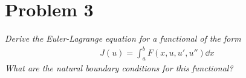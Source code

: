 \documentclass[12pt]{article}
\theoremstyle{plain}
\begin{document}

\section*{Problem 3}
\textit{Derive the Euler-Lagrange equation for a functional of the form}
\begin{align*}
    J(u) = \int_a^b F(x, u, u', u'') \dd x
\end{align*}
\textit{What are the natural boundary conditions for this functional?} \\
\end{document}
